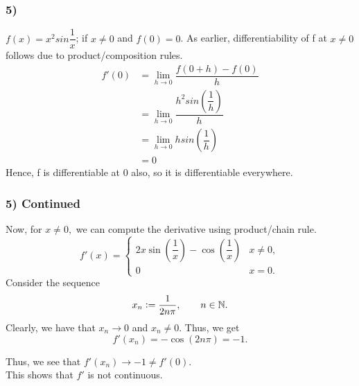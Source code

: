 \documentclass[handout]{beamer}
\begin{document}
\begin{frame}
\frametitle{5)}
$f(x) = x^2sin\dfrac{1}{x}$; if $x \neq 0$ and $f(0) = 0$.
As earlier, differentiability of f at $x \ne 0 $ follows due to product/composition
rules.
\begin{align*}
f'(0)&=\underset{h \to 0}{\lim}\dfrac{f(0+h)-f(0)}{h}\\
&=\underset{h \to 0}{\lim}\dfrac{h^2sin(\dfrac{1}{h})}{h}\\
&=\underset{h \to 0}{\lim}hsin(\dfrac{1}{h})\\
&=0
\end{align*}
Hence, f is differentiable at 0 also, so it is differentiable everywhere.
\end{frame}
\begin{frame}
    \frametitle{5) Continued}
    Now, for $x \neq 0,$ we can compute the derivative using product/chain rule.
    \begin{equation*} 
        f'(x) = \begin{cases}
            2x\sin\left(\dfrac{1}{x}\right) - \cos\left(\dfrac{1}{x}\right) & x \neq 0,\\
            0 & x = 0.
        \end{cases}
    \end{equation*}
Consider the sequence
		\begin{equation*} 
			x_n \vcentcolon= \dfrac{1}{2n\pi}, \qquad n \in \mathbb{N}.
		\end{equation*}
		Clearly, we have that $x_n \to 0$ and $x_n \neq 0.$ Thus, we get
		\begin{equation*} 
			f'(x_n) = -\cos(2n\pi) = -1.
		\end{equation*}

		Thus, we see that $f'(x_n) \to -1 \neq f'(0).$ \\
		This shows that $f'$ is not continuous.
\end{frame}
\end{document}
